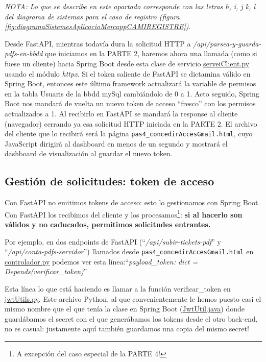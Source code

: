 \documentclass[a4paper,12pt]{report}
\begin{document}
		\textit{NOTA: Lo que se describe en este apartado corresponde con las letras h, i, j k, l del diagrama de sistemas para el caso de registro (figura \ref{fig:diagramaSistemesAplicacioMercappCAMIREGISTRE})}.
		
		Desde FastAPI, mientras todavía dura la solicitud HTTP a \textit{/api/parsea-y-guarda-pdfs-en-bbdd} que iniciamos en la PARTE 2, haremos ahora una llamada (como si fuese un cliente) hacia Spring Boot desde esta clase de servicio \href{https://github.com/blackcub3s/mercApp/blob/main/APP%20WEB/__FastAPI__/app/serveiClient.py}{serveiClient.py} usando el módulo \textit{httpx}. Si el token saliente de FastAPI se dictamina válido en Spring Boot, entonces este último framework actualizará la variable de permisos en la tabla Usuaris de la bbdd mySql cambiándolo de 0 a 1. Acto seguido, Spring Boot nos mandará de vuelta un nuevo token de acceso ``fresco'' con los permisos actualizados a 1. Al recibirlo en FastAPI se mandará la response al cliente (navegador) cerrando ya esa solicitud HTTP iniciada en la PARTE 2. El archivo del cliente que lo recibirá será la página \texttt{pas4\_concedirAccesGmail.html}, cuyo JavaScript dirigirá al dashboard en menos de un segundo y mostrará el dashboard de visualización al guardar el nuevo token.
		
		
	
	
	\subsection{Gestión de solicitudes: token de acceso}
	
	Con FastAPI no emitimos tokens de acceso: esto lo gestionamos con Spring Boot. Con FastAPI los recibimos del cliente y los procesamos\footnote{A excepción del caso especial de la PARTE 4!}: \textbf{si al hacerlo son válidos y no caducados, permitimos solicitudes entrantes.}
	
	Por ejemplo, en dos endpoints de FastAPI (``\textit{/api/subir-tickets-pdf}'' y ``\textit{/api/conta-pdfs-servidor}'') llamados desde \texttt{pas4\_concedirAccesGmail.html} en \href{https://github.com/blackcub3s/mercApp/blob/main/APP%20WEB/__FastAPI__/app/controlador.py}{controlador.py}  podemos ver esta línea:``\textit{payload\_token: dict = Depends(verificar\_token)}''
	 
	 Esta línea lo que está haciendo es llamar a la función verificar\_token en \href{https://github.com/blackcub3s/mercApp/blob/main/APP%20WEB/__FastAPI__/app/jwtUtil.py}{jwtUtils.py}. Este archivo Python, al que convenientemente le hemos puesto casi el mismo nombre que el que tenía la clase en Spring Boot (\href{https://github.com/blackcub3s/mercApp/blob/main/APP%20WEB/__springboot__produccio__/app/src/main/java/miApp/app/seguretat/jwt/JwtUtil.java}{JwtUtil.java}) donde guardábamos el secret con el que generábamos los tokens desde el otro back-end, no es casual: justamente aquí también guardamos una copia del mismo secret!
	
\end{document}
